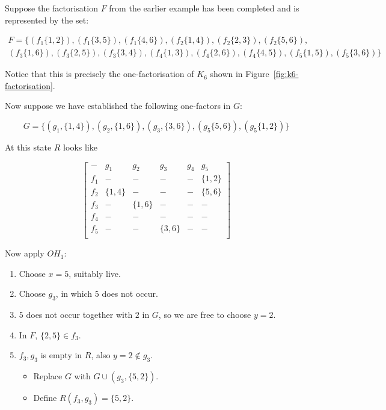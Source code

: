 \begin{example}
Suppose the factorisation $F$ from the earlier example has
been completed and is represented by the set:

\begin{equation}
  \begin{split}
    F = \{(f_1\{1,2\}),(f_1\{3,5\}),(f_1\{4,6\}),(f_2\{1,4\}),(f_2\{2,3\}),(f_2\{5,6\}), \\
    (f_3\{1,6\}),(f_3\{2,5\}),(f_3\{3,4\}),(f_4\{1,3\}),(f_4\{2,6\}),(f_4\{4,5\}),(f_5\{1,5\}),(f_5\{3,6\})\}
  \end{split}
\end{equation}

Notice that this is precisely the one-factorisation of $K_6$ shown in Figure~\ref{fig:k6-factorisation}.

Now suppose we have established the following one-factors in
$G$:

\begin{equation}
  G = \{(g_1, \{1, 4\}), (g_2, \{1, 6\}), (g_3, \{3, 6\}), (g_5\{5, 6\}), (g_5\{1, 2\})\}
\end{equation}

At this state $R$ looks like 

\begin{equation}
  \begin{bmatrix}
     -  &   g_1    &    g_2    &    g_3   & g_4 &    g_5    \\
    f_1 &     -    &     -     &    -     &  -  & \{1, 2\}  \\
    f_2 & \{1, 4\} &     -     &    -     &  -  & \{5, 6\}  \\
    f_3 &     -    &  \{1, 6\} &    -     &  -  &     -     \\
    f_4 &     -    &     -     &    -     &  -  &     -     \\
    f_5 &     -    &     -     & \{3, 6\} &  -  &     -     \\
  \end{bmatrix}
\end{equation}

Now apply $OH_1$:

\begin{enumerate}
  \item{Choose $x = 5$, suitably live.}
  \item{Choose $g_3$, in which $5$ does not occur.}
  \item{$5$ does not occur together with $2$ in $G$, so we are
     free to choose $y = 2$.}
  \item{In $F$, $\{2, 5\} \in f_3$.}
  \item{
    $f_3, g_3$ is empty in $R$, also $y = 2 \notin g_3$.
    \begin{itemize}
       \item{Replace $G$ with $G \cup (g_3, \{5, 2\})$.}
       \item{Define $R(f_3, g_3) = \{5, 2\}$.}
    \end{itemize}
  }
\end{enumerate}


\end{example}
